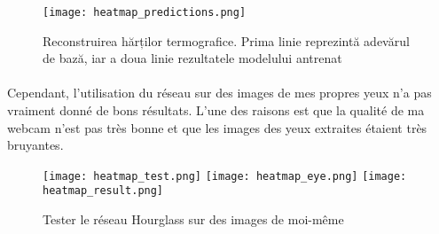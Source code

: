 \begin{figure}[h]
    \centering
    \texttt{[image: heatmap\_predictions.png]}
    \caption{Reconstruirea hărților termografice. Prima linie reprezintă adevărul de bază, iar a doua linie rezultatele modelului antrenat}
\end{figure}

\paragraph{}
Cependant, l'utilisation du réseau sur des images de mes propres yeux n'a pas vraiment donné de bons résultats.
L'une des raisons est que la qualité de ma webcam n'est pas très bonne et que les images des yeux extraites étaient très bruyantes.

\begin{figure}[h]
    \centering
    \texttt{[image: heatmap\_test.png]}
    \texttt{[image: heatmap\_eye.png]}
    \texttt{[image: heatmap\_result.png]}
    \caption{Tester le réseau Hourglass sur des images de moi-même}
\end{figure}